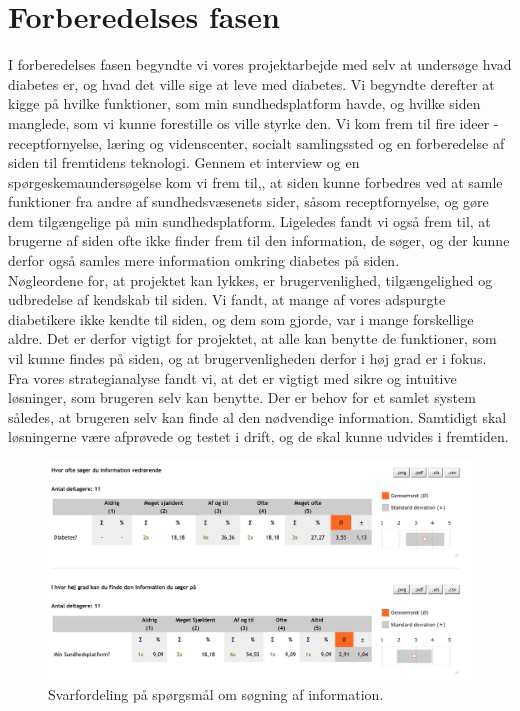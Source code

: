 \section{Forberedelses fasen}
I forberedelses fasen begyndte vi vores projektarbejde med selv at undersøge hvad diabetes er, og hvad det ville sige at leve med diabetes. Vi begyndte derefter at kigge på hvilke funktioner, som min sundhedsplatform havde, og hvilke siden manglede, som vi kunne forestille os ville styrke den. Vi kom frem til fire ideer - receptfornyelse, læring og videnscenter, socialt samlingssted og en forberedelse af siden til fremtidens teknologi. Gennem et interview og en spørgeskemaundersøgelse kom vi frem til,, at siden kunne forbedres ved at samle funktioner fra andre af sundhedsvæsenets sider, såsom receptfornyelse, og gøre dem tilgængelige på min sundhedsplatform. Ligeledes fandt vi også frem til, at brugerne af siden ofte ikke finder frem til den information, de søger, og der kunne derfor også samles mere information omkring diabetes på siden.\\
Nøgleordene for, at projektet kan lykkes, er brugervenlighed, tilgængelighed og udbredelse af kendskab til siden. Vi fandt, at mange af vores adspurgte diabetikere ikke kendte til siden, og dem som gjorde, var i mange forskellige aldre. Det er derfor vigtigt for projektet, at alle kan benytte de funktioner, som vil kunne findes på siden, og at brugervenligheden derfor i høj grad er i fokus.\\
Fra vores strategianalyse fandt vi, at det er vigtigt med sikre og intuitive løsninger, som brugeren selv kan benytte. Der er behov for et samlet system således, at brugeren selv kan finde al den nødvendige information. Samtidigt skal løsningerne være afprøvede og testet i drift, og de skal kunne udvides i fremtiden.
\begin{figure}[H]
	\centering
	\includegraphics[width=\textwidth]{Materials/SeekingInformation}
	\caption{Svarfordeling på spørgsmål om søgning af information.}
\end{figure}
